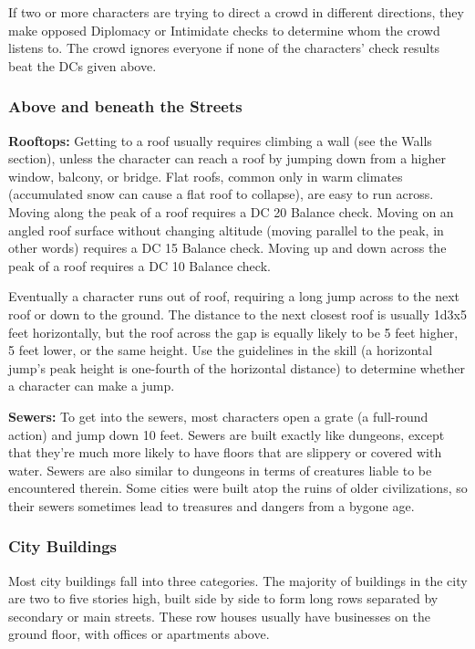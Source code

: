If two or more characters are trying to direct a crowd in different directions, 
they make opposed Diplomacy or Intimidate checks to determine whom the crowd listens 
to. The crowd ignores everyone if none of the characters' check results beat the 
DCs given above.

\subsubsection{Above and beneath the Streets}

\textbf{Rooftops:} Getting to a roof usually requires climbing a wall (see the 
Walls section), unless the character can reach a roof by jumping down from a higher 
window, balcony, or bridge. Flat roofs, common only in warm climates (accumulated 
snow can cause a flat roof to collapse), are easy to run across. Moving along the 
peak of a roof requires a DC 20 Balance check. Moving on an angled roof surface 
without changing altitude (moving parallel to the peak, in other words) requires 
a DC 15 Balance check. Moving up and down across the peak of a roof requires a 
DC 10 Balance check.

Eventually a character runs out of roof, requiring a long jump across to the next 
roof or down to the ground. The distance to the next closest roof is usually 1d3x5 
feet horizontally, but the roof across the gap is equally likely to be 5 feet higher, 
5 feet lower, or the same height. Use the guidelines in the  skill 
(a horizontal jump's peak height is one-fourth of the horizontal distance) to 
determine whether a character can make a jump.

\textbf{Sewers:} To get into the sewers, most characters open a grate (a full-round 
action) and jump down 10 feet. Sewers are built exactly like dungeons, except that 
they're much more likely to have floors that are slippery or covered with water. 
Sewers are also similar to dungeons in terms of creatures liable to be encountered 
therein. Some cities were built atop the ruins of older civilizations, so their 
sewers sometimes lead to treasures and dangers from a bygone age.

\subsubsection{City Buildings}

Most city buildings fall into three categories. The majority of buildings in the 
city are two to five stories high, built side by side to form long rows separated 
by secondary or main streets. These row houses usually have businesses on the ground 
floor, with offices or apartments above.

